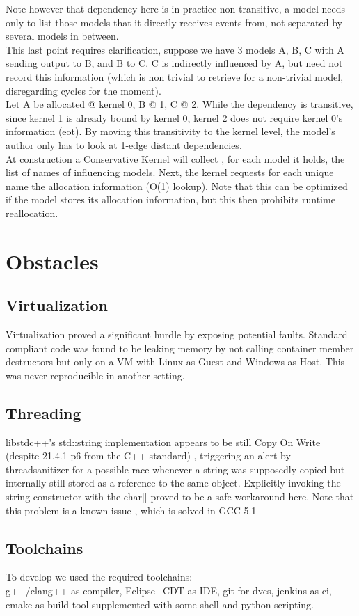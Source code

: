 \documentclass[8pt,a4paper]{report}
\begin{document}
Note however that dependency here is in practice non-transitive, a model needs only to list those models that it directly receives events from, not separated by several models in between. \\
This last point requires clarification, suppose we have 3 models A, B, C with A sending output to B, and B to C. C is indirectly influenced by A, but need not record this information (which is non trivial to retrieve for a non-trivial model, disregarding cycles for the moment). \\
Let A be allocated @ kernel 0, B @ 1, C @ 2. While the dependency is transitive, since kernel 1 is already bound by kernel 0, kernel 2 does not require kernel 0's information (eot). By moving this transitivity to the kernel level, the model's author only has to look at 1-edge distant dependencies. \\
At construction a Conservative Kernel will collect , for each model it holds, the list of names of influencing models. Next, the kernel requests for each unique name the allocation information (O(1) lookup). Note that this can be optimized if the model stores its allocation information, but this then prohibits runtime reallocation.



\chapter{Obstacles}
\section{Virtualization}
Virtualization proved a significant hurdle by exposing potential faults. Standard compliant code was found to be leaking memory by not calling container member destructors but only on a VM with Linux as Guest and Windows as Host. This was never reproducible in another setting.
\section{Threading}
libstdc++'s std::string implementation appears to be still Copy On Write (despite 21.4.1 p6 from the C++ standard) \cite{cpp}, triggering an alert by threadsanitizer for a possible race whenever a string was supposedly copied but internally still stored as a reference to the same object. Explicitly invoking the string constructor with the char[] proved to be a safe workaround here. Note that this problem is a known issue \cite{cow}, which is solved in GCC 5.1
\section{Toolchains}
To develop we used the required toolchains:\\ g++/clang++ as compiler, Eclipse+CDT as IDE, git for dvcs, jenkins as ci, cmake as build tool supplemented with some shell and python scripting.
\end{document}
